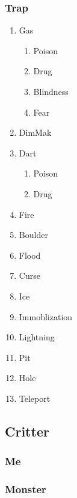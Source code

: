 \documentclass[10pt,oneside,x11names]{article}
\begin{document}
\subsubsection{Trap}
\label{sec:orgheadline45}
\begin{enumerate}
\item Gas
\label{sec:orgheadline30}
\begin{enumerate}
\item Poison
\label{sec:orgheadline26}
\item Drug
\label{sec:orgheadline27}
\item Blindness
\label{sec:orgheadline28}
\item Fear
\label{sec:orgheadline29}
\end{enumerate}
\item DimMak
\label{sec:orgheadline31}
\item Dart
\label{sec:orgheadline34}
\begin{enumerate}
\item Poison
\label{sec:orgheadline32}
\item Drug
\label{sec:orgheadline33}
\end{enumerate}
\item Fire
\label{sec:orgheadline35}
\item Boulder
\label{sec:orgheadline36}
\item Flood
\label{sec:orgheadline37}
\item Curse
\label{sec:orgheadline38}
\item Ice
\label{sec:orgheadline39}
\item Immoblization
\label{sec:orgheadline40}
\item Lightning
\label{sec:orgheadline41}
\item Pit
\label{sec:orgheadline42}
\item Hole
\label{sec:orgheadline43}
\item Teleport
\label{sec:orgheadline44}
\end{enumerate}
\subsection{Critter}
\label{sec:orgheadline49}
\subsubsection{Me}
\label{sec:orgheadline47}
\subsubsection{Monster}
\label{sec:orgheadline48}
\end{document}
